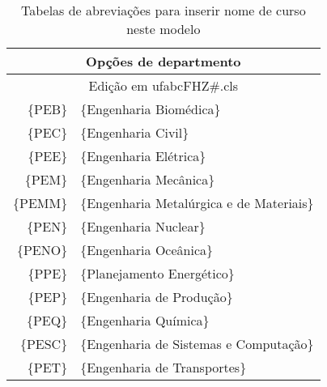 \begin{table}[H]
	\centering
	\caption{Tabelas de abreviações para inserir nome de curso neste modelo}
	\label{tab_siglas_cursos_ufabc}
	\small
	\begin{tabular}{r|l}
		\multicolumn{2}{c}{Opções de departmento}                                                                        \\ \hline
		\multicolumn{2}{c}{Edição em ufabcFHZ\#.cls}                                                                    \\ \hline
		\{PEB\}                                              & \{Engenharia Biomédica\}                                             \\
		\{PEC\}                                              & \{Engenharia Civil\}                                                 \\
		\{PEE\}                                              & \{Engenharia Elétrica\}                                              \\
		\{PEM\}                                              & \{Engenharia Mecânica\}                                              \\
		\{PEMM\}                                             & \{Engenharia Metalúrgica e de Materiais\}                            \\
		\{PEN\}                                              & \{Engenharia Nuclear\}                                               \\
		\{PENO\}                                             & \{Engenharia Oceânica\}                                              \\
		\{PPE\}                                              & \{Planejamento Energético\}                                          \\
		\{PEP\}                                              & \{Engenharia de Produção\}                                           \\
		\{PEQ\}                                              & \{Engenharia Química\}                                               \\
		\{PESC\}                                             & \{Engenharia de Sistemas e Computação\}                              \\
		\{PET\}                                              & \{Engenharia de Transportes\}                                        \\\hline

\end{tabular}
\end{table}

